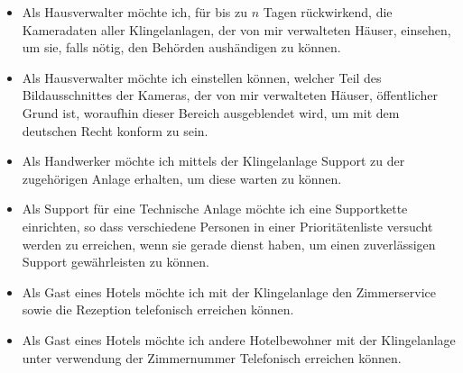 \begin{itemize}
\begin{description}
        \end{description}
    \item Als Hausverwalter möchte ich, für bis zu $n$ Tagen rückwirkend, die Kameradaten aller Klingelanlagen, der von mir verwalteten Häuser, einsehen, um sie, falls nötig, den Behörden aushändigen zu können.
    \item Als Hausverwalter möchte ich einstellen können, welcher Teil des Bildausschnittes der Kameras, der von mir verwalteten Häuser, öffentlicher Grund ist, woraufhin dieser Bereich ausgeblendet wird, um mit dem deutschen Recht konform zu sein.
    \item Als Handwerker möchte ich mittels der Klingelanlage Support zu der zugehörigen Anlage erhalten, um diese warten zu können.
    \item Als Support für eine Technische Anlage möchte ich eine Supportkette einrichten, so dass verschiedene Personen in einer Prioritätenliste versucht werden zu erreichen, wenn sie gerade dienst haben, um einen zuverlässigen Support gewährleisten zu können.
    \item Als Gast eines Hotels möchte ich mit der Klingelanlage den Zimmerservice sowie die Rezeption telefonisch erreichen können.
    \item Als Gast eines Hotels möchte ich andere Hotelbewohner mit der Klingelanlage unter verwendung der Zimmernummer Telefonisch erreichen können.
\end{itemize}
